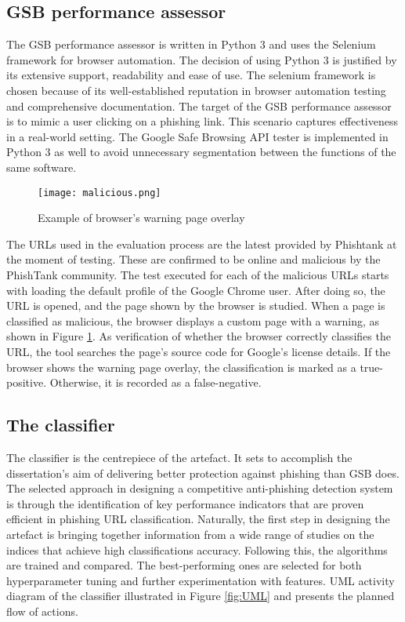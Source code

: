 \subsection{GSB performance assessor}
The GSB performance assessor is written in Python 3 and uses the Selenium framework for browser automation. The decision of using Python 3 is justified by its extensive support, readability and ease of use. The selenium framework is chosen because of its well-established reputation in browser automation testing and comprehensive documentation.
The target of the GSB performance assessor is to mimic a user clicking on a phishing link. This scenario captures effectiveness in a real-world setting. The Google Safe Browsing API tester is implemented in Python 3 as well to avoid unnecessary segmentation between the functions of the same software.

\begin{figure}[!b]
	\centering
	\texttt{[image: malicious.png]}
	\caption{Example of browser's warning page overlay}
	\label{fig:PHISHING_PREVENTED}
\end{figure}

The URLs used in the evaluation process are the latest provided by Phishtank at the moment of testing. These are confirmed to be online and malicious by the PhishTank community. The test executed for each of the malicious URLs starts with loading the default profile of the Google Chrome user. After doing so, the URL is opened, and the page shown by the browser is studied. When a page is classified as malicious, the browser displays a custom page with a warning, as shown in Figure \ref{fig:PHISHING_PREVENTED}. As verification of whether the browser correctly classifies the URL, the tool searches the page's source code for Google's license details. If the browser shows the warning page overlay, the classification is marked as a true-positive. Otherwise, it is recorded as a false-negative.

\subsection{The classifier}
The classifier is the centrepiece of the artefact. It sets to accomplish the dissertation's aim of delivering better protection against phishing than GSB does. The selected approach in designing a competitive anti-phishing detection system is through the identification of key performance indicators that are proven efficient in phishing URL classification. Naturally, the first step in designing the artefact is bringing together information from a wide range of studies on the indices that achieve high classifications accuracy. Following this, the algorithms are trained and compared. The best-performing ones are selected for both hyperparameter tuning and further experimentation with features. UML activity diagram of the classifier illustrated in Figure \ref{fig:UML} and presents the planned flow of actions.

